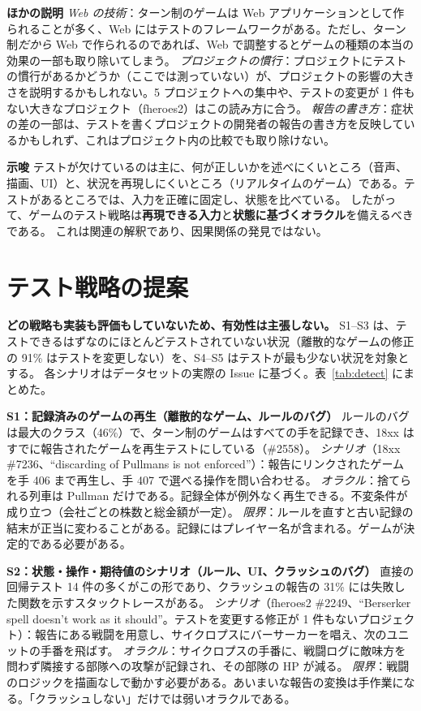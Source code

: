 \documentclass[a4paper,twocolumn,9pt]{ltjsarticle}
\newcommand{\para}[1]{\par\smallskip\noindent\textbf{#1}\quad}
\begin{document}
\para{ほかの説明}
\emph{Web の技術}：ターン制のゲームは Web アプリケーションとして作られることが多く、Web にはテストのフレームワークがある。ただし、ターン制\emph{だから} Web で作られるのであれば、Web で調整するとゲームの種類の本当の効果の一部も取り除いてしまう。
\emph{プロジェクトの慣行}：プロジェクトにテストの慣行があるかどうか（ここでは測っていない）が、プロジェクトの影響の大きさを説明するかもしれない。5 プロジェクトへの集中や、テストの変更が 1 件もない大きなプロジェクト（fheroes2）はこの読み方に合う。
\emph{報告の書き方}：症状の差の一部は、テストを書くプロジェクトの開発者の報告の書き方を反映しているかもしれず、これはプロジェクト内の比較でも取り除けない。

\para{示唆}
テストが欠けているのは主に、何が正しいかを述べにくいところ（音声、描画、UI）と、状況を再現しにくいところ（リアルタイムのゲーム）である。テストがあるところでは、入力を正確に固定し、状態を比べている。
したがって、ゲームのテスト戦略は\textbf{再現できる入力}と\textbf{状態に基づくオラクル}を備えるべきである。
これは関連の解釈であり、因果関係の発見ではない。

\section{テスト戦略の提案}\label{sec:strategies}

\textbf{どの戦略も実装も評価もしていないため、有効性は主張しない。}
S1--S3 は、テストできるはずなのにほとんどテストされていない状況（離散的なゲームの修正の 91\% はテストを変更しない）を、S4--S5 はテストが最も少ない状況を対象とする。
各シナリオはデータセットの実際の Issue に基づく。表~\ref{tab:detect} にまとめた。

\para{S1：記録済みのゲームの再生（離散的なゲーム、ルールのバグ）}
ルールのバグは最大のクラス（46\%）で、ターン制のゲームはすべての手を記録でき、18xx はすでに報告されたゲームを再生テストにしている（\#2558）。
\emph{シナリオ}（18xx \#7236、``discarding of Pullmans is not enforced''）：報告にリンクされたゲームを手 406 まで再生し、手 407 で選べる操作を問い合わせる。
\emph{オラクル}：捨てられる列車は Pullman だけである。記録全体が例外なく再生できる。不変条件が成り立つ（会社ごとの株数と総金額が一定）。
\emph{限界}：ルールを直すと古い記録の結末が正当に変わることがある。記録にはプレイヤー名が含まれる。ゲームが決定的である必要がある。

\para{S2：状態・操作・期待値のシナリオ（ルール、UI、クラッシュのバグ）}
直接の回帰テスト 14 件の多くがこの形であり、クラッシュの報告の 31\% には失敗した関数を示すスタックトレースがある。
\emph{シナリオ}（fheroes2 \#2249、``Berserker spell doesn't work as it should''。テストを変更する修正が 1 件もないプロジェクト）：報告にある戦闘を用意し、サイクロプスにバーサーカーを唱え、次のユニットの手番を飛ばす。
\emph{オラクル}：サイクロプスの手番に、戦闘ログに敵味方を問わず隣接する部隊への攻撃が記録され、その部隊の HP が減る。
\emph{限界}：戦闘のロジックを描画なしで動かす必要がある。あいまいな報告の変換は手作業になる。「クラッシュしない」だけでは弱いオラクルである。
\end{document}
